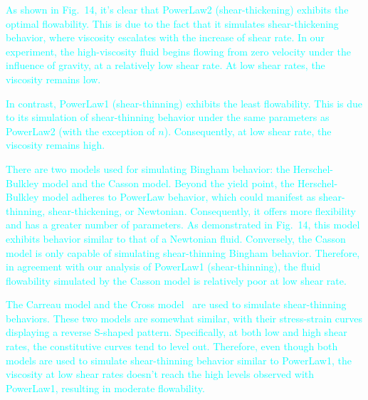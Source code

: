 \documentclass[10pt,journal,compsoc]{IEEEtran}
\newcommand{\revised}[1]{{\textcolor{cyan}{#1}}}
\begin{document}

\revised{As shown in Fig.~14, it's clear that PowerLaw2 (shear-thickening) exhibits the optimal flowability. This is due to the fact that it simulates shear-thickening behavior, where viscosity escalates with the increase of shear rate. In our experiment, the high-viscosity fluid begins flowing from zero velocity under the influence of gravity, at a relatively low shear rate. At low shear rates, the viscosity remains low. }

\revised{In contrast, PowerLaw1 (shear-thinning) exhibits the least flowability. This is due to its simulation of shear-thinning behavior under the same parameters as PowerLaw2 (with the exception of $n$). Consequently, at low shear rate, the viscosity remains high.}

\revised{There are two models used for simulating Bingham behavior: the Herschel-Bulkley model and the Casson model. Beyond the yield point, the Herschel-Bulkley model adheres to PowerLaw behavior, which could manifest as shear-thinning, shear-thickening, or Newtonian. Consequently, it offers more flexibility and has a greater number of parameters. As demonstrated in Fig.~14, this model exhibits behavior similar to that of a Newtonian fluid. Conversely, the Casson model is only capable of simulating shear-thinning Bingham behavior. Therefore, in agreement with our analysis of PowerLaw1 (shear-thinning), the fluid flowability simulated by the Casson model is relatively poor at low shear rate.}

\revised{The Carreau model and the Cross model~\cite{Cross1965} are used to simulate shear-thinning behaviors. These two models are somewhat similar, with their stress-strain curves displaying a reverse S-shaped pattern. Specifically, at both low and high shear rates, the constitutive curves tend to level out. Therefore, even though both models are used to simulate shear-thinning behavior similar to PowerLaw1, the viscosity at low shear rates doesn't reach the high levels observed with PowerLaw1, resulting in moderate flowability.}
\end{document}
